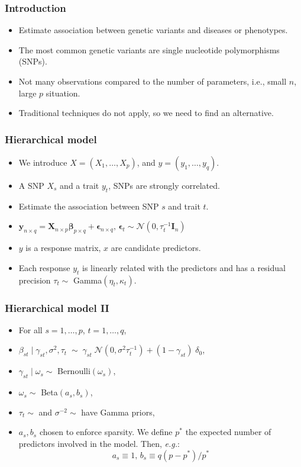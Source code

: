 \documentclass{beamer}
\begin{document}
\begin{frame}
\frametitle{Introduction}
\begin{itemize}
\item Estimate association between genetic variants and diseases or phenotypes.
\item The most common genetic variants are single nucleotide polymorphisms (SNPs).
\item Not many observations compared to the number of parameters, i.e., small $n$, large $p$ situation.
\item Traditional techniques do not apply, so we need to find an alternative.
\end{itemize}

\end{frame}
\begin{frame}
\frametitle{Hierarchical model}
\begin{itemize}
\item We introduce $X = (X_1,\ldots,X_p)$, and $y = (y_1,\ldots,y_q)$.
\item A SNP $X_s$ and a trait $y_t$, SNPs are strongly correlated.
\item Estimate the association between SNP $s$ and trait $t$.
\item $\boldsymbol{y}_{n\times q} = \boldsymbol{X}_{n\times p}\boldsymbol{\beta}_{p \times q} + \boldsymbol{\epsilon}_{n\times q}\text{, }\boldsymbol{\epsilon}_t \sim \mathcal{N}(0,\tau_t^{-1}\boldsymbol{I}_n)$
\item $y$ is a response matrix, $x$ are candidate predictors.

\item Each response $y_t$ is linearly related with the predictors and has a residual precision $\tau_t \sim $ Gamma$(\eta_t, \kappa_t)$.

\end{itemize}
\end{frame}
\begin{frame}
\frametitle{Hierarchical model II}
\begin{itemize}
\item For all $s = 1,\ldots,p$, $t=1,\ldots,q$,
\item $\beta_{st}\mid\gamma_{st},\sigma^2,\tau_t\; \sim\; \gamma_{st}\;\mathcal{N}(0,\sigma^2\tau_t^{-1})+(1-\gamma_{st})\;\delta_0$,
\item $\gamma_{st} \mid \omega_{s} \sim $ Bernoulli$(\omega_s)$,
\item $\omega_s \sim $ Beta$(a_s,b_s)$,
\item $\tau_t \sim $ and $\sigma^{-2} \sim $ have Gamma priors,
\item $a_s, b_s$ chosen to enforce sparsity. We define $p^*$ the expected number of predictors involved in the model. Then, \textit{e.g.}:
$$
a_s \equiv 1\text{, }b_s \equiv q(p-p^*)/p^*
$$

\end{itemize}

\end{frame}
\end{document}
